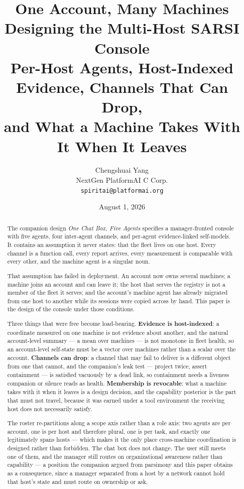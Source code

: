 \documentclass[11pt]{article}
\title{\LARGE One Account, Many Machines\\[6pt]
\Large Designing the Multi-Host SARSI Console\\[4pt]
\large Per-Host Agents, Host-Indexed Evidence, Channels That Can Drop,\\
\large and What a Machine Takes With It When It Leaves}
\author{Chengshuai Yang\\
\small NextGen PlatformAI C Corp.\\
\small \texttt{spiritai@platformai.org}}
\date{August 1, 2026}
\begin{document}
\maketitle
\thispagestyle{empty}

\begin{abstract}
\noindent
The companion design \emph{One Chat Box, Five Agents} specifies a manager-fronted console with five agents, four inter-agent channels, and per-agent evidence-linked self-models. It contains an assumption it never states: that the fleet lives on one host. Every channel is a function call, every report arrives, every measurement is comparable with every other, and the machine agent is a singular noun.

That assumption has failed in deployment. An account now owns several machines; a machine joins an account and can leave it; the host that serves the registry is not a member of the fleet it serves; and the account's machine agent has already migrated from one host to another while its sessions were copied across by hand. This paper is the design of the console under those conditions.

Three things that were free become load-bearing. \textbf{Evidence is host-indexed}: a coordinate measured on one machine is not evidence about another, and the natural account-level summary --- a mean over machines --- is not monotone in fleet health, so an account-level self-state must be a vector over machines rather than a scalar over the account. \textbf{Channels can drop}: a channel that may fail to deliver is a different object from one that cannot, and the companion's leak test --- project twice, assert containment --- is satisfied vacuously by a dead link, so containment needs a liveness companion or silence reads as health. \textbf{Membership is revocable}: what a machine takes with it when it leaves is a design decision, and the capability posterior is the part that must not travel, because it was earned under a tool environment the receiving host does not necessarily satisfy.

The roster re-partitions along a scope axis rather than a role axis: two agents are per account, one is per host and therefore plural, one is per task, and exactly one legitimately spans hosts --- which makes it the only place cross-machine coordination is designed rather than forbidden. The chat box does not change. The user still meets one of them, and the manager still routes on organizational awareness rather than capability --- a position the companion argued from parsimony and this paper obtains as a consequence, since a manager separated from a host by a network cannot hold that host's state and must route on ownership or ask.
\end{abstract}
\end{document}

